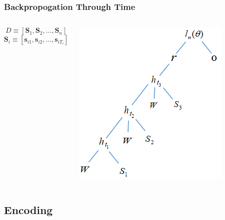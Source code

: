 \documentclass[pdf]{beamer}
\begin{document}
\begin{frame}
  \frametitle{Backpropogation Through Time}
  \begin{columns}
    \[ D\equiv [\boldsymbol{S}_1, \boldsymbol{S}_2, \ldots, \boldsymbol{S}_n] \]
    \[ \boldsymbol{S}_i\equiv [\boldsymbol{s}_{i1}, \boldsymbol{s}_{i2}, \ldots, \boldsymbol{s}_{iT_i}] \]
    \begin{center}
      \includegraphics[scale=0.8]{functional_hierarchy.png}
    \end{center}
  \end{columns}
\end{frame}

\subsection{Encoding}
\end{document}
